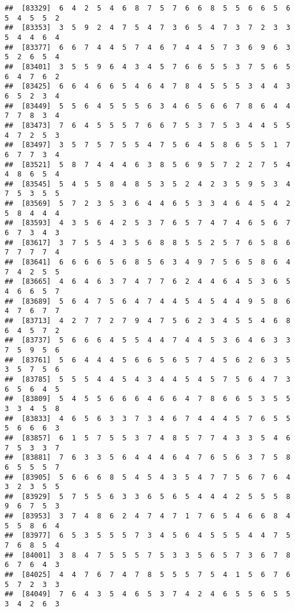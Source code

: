 \documentclass[
]{book}
\begin{document}
\begin{verbatim}
##  [83329]  6  4  2  5  4  6  8  7  5  7  6  6  8  5  5  6  6  5  6  5  4  5  5  2
##  [83353]  3  5  9  2  4  7  5  4  7  3  6  5  4  7  3  7  2  3  3  5  4  4  6  4
##  [83377]  6  6  7  4  4  5  7  4  6  7  4  4  5  7  3  6  9  6  3  5  2  6  5  4
##  [83401]  3  5  5  9  6  4  3  4  5  7  6  6  5  5  3  7  5  6  5  6  4  7  6  2
##  [83425]  6  6  4  6  6  5  4  6  4  7  8  4  5  5  5  3  4  4  3  6  5  2  3  4
##  [83449]  5  5  6  4  5  5  5  6  3  4  6  5  6  6  7  8  6  4  4  7  7  8  3  4
##  [83473]  7  6  4  5  5  5  7  6  6  7  5  3  7  5  3  4  4  5  5  4  7  2  5  3
##  [83497]  3  5  7  5  7  5  5  4  7  5  6  4  5  8  6  5  5  1  7  6  7  7  3  4
##  [83521]  5  8  7  4  4  4  6  3  8  5  6  9  5  7  2  2  7  5  4  4  8  6  5  4
##  [83545]  5  4  5  5  8  4  8  5  3  5  2  4  2  3  5  9  5  3  4  7  5  3  5  5
##  [83569]  5  7  2  3  5  3  6  4  4  6  5  3  3  4  6  4  5  4  2  5  8  4  4  4
##  [83593]  4  3  5  6  4  2  5  3  7  6  5  7  4  7  4  6  5  6  7  6  7  3  4  3
##  [83617]  3  7  5  5  4  3  5  6  8  8  5  5  2  5  7  6  5  8  6  7  7  7  7  4
##  [83641]  6  6  6  6  5  6  8  5  6  3  4  9  7  5  6  5  8  6  4  7  4  2  5  5
##  [83665]  4  6  4  6  3  7  4  7  7  6  2  4  4  6  4  5  3  6  5  4  6  6  5  7
##  [83689]  5  6  4  7  5  6  4  7  4  4  5  4  5  4  4  9  5  8  6  4  7  6  7  7
##  [83713]  4  2  7  7  2  7  9  4  7  5  6  2  3  4  5  5  4  6  8  6  4  5  7  2
##  [83737]  5  6  6  6  4  5  5  4  4  7  4  4  5  3  6  4  6  3  3  7  5  9  5  6
##  [83761]  5  6  4  4  4  5  6  6  5  6  5  7  4  5  6  2  6  3  5  3  5  7  5  6
##  [83785]  5  5  5  4  4  5  4  3  4  4  5  4  5  7  5  6  4  7  3  6  5  6  4  5
##  [83809]  5  4  5  5  6  6  6  4  6  6  4  7  8  6  6  5  3  5  5  3  3  4  5  8
##  [83833]  4  6  5  6  3  3  7  3  4  6  7  4  4  4  5  7  6  5  5  5  6  6  6  3
##  [83857]  6  1  5  7  5  5  3  7  4  8  5  7  7  4  3  3  5  4  6  7  5  3  3  7
##  [83881]  7  6  3  3  5  6  4  4  4  6  4  7  6  5  6  3  7  5  8  6  5  5  5  7
##  [83905]  5  6  6  6  8  5  4  5  4  3  5  4  7  7  5  6  7  6  4  3  2  3  5  5
##  [83929]  5  7  5  5  6  3  3  6  5  6  5  4  4  4  2  5  5  5  8  9  6  7  5  3
##  [83953]  3  7  4  8  6  2  4  7  4  7  1  7  6  5  4  6  6  8  4  5  5  8  6  4
##  [83977]  6  5  3  5  5  5  7  3  4  5  6  4  5  5  5  4  4  7  5  7  6  8  5  4
##  [84001]  3  8  4  7  5  5  5  7  5  3  3  5  6  5  7  3  6  7  8  6  7  6  4  3
##  [84025]  4  4  7  6  7  4  7  8  5  5  5  7  5  4  1  5  6  7  6  5  7  2  3  3
##  [84049]  7  6  4  3  5  4  6  5  3  7  4  2  4  6  5  5  6  5  5  3  4  2  6  3

\end{verbatim}
\end{document}
